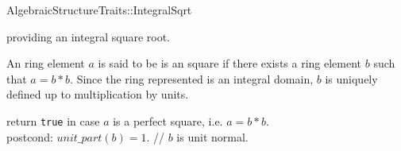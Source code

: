

\begin{ccRefConcept}{AlgebraicStructureTraits::IntegralSqrt}

\begin{ccAdvanced}
\ccDefinition

 providing an integral square root. 

An ring element $a$ is said to be is an square if there exists a ring element $b$ such 
that $a= b*b$. Since the ring represented is an integral domain, 
$b$ is uniquely defined up to multiplication by units. 

\ccRefines 


\ccTypes

\ccGlue
{}\ccGlue
{}

\ccOperations
{}
        { return {\tt true} in case $a$ is a perfect square, i.e. $a = b*b$.\\
          postcond: $unit\_part(b) = 1$. // $b$ is unit normal. 
        }


\ccSeeAlso

\end{ccAdvanced}

\end{ccRefConcept} 